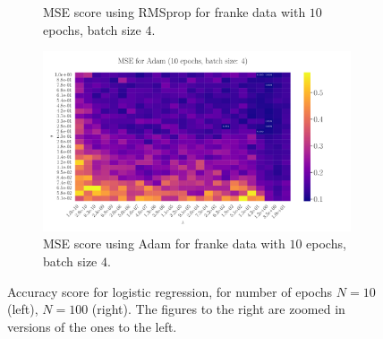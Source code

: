 \documentclass[%
reprint,s
amsmath,amssymb,
aps,
]{revtex4-2}
\begin{document}
\begin{figure}
\begin{subfigure}{0.41\textwidth}
		\caption{MSE score using RMSprop for franke data with \(10\) epochs, batch size \(4\).}
		\label{fig:LinReg25x25_epoch100_bacthS50}
	\end{subfigure}
	\hfill
	\begin{subfigure}{0.41\textwidth}
		\includegraphics[width=\textwidth]{Figures/LinRegAdam_25x25_epoch10_batchS4_zoomed.pdf}
		\caption{MSE score using Adam for franke data with \(10\) epochs, batch size \(4\).}
		\label{fig:LinReg25x25_epoch100_bacthS50_zoomed}
	\end{subfigure}
	\caption{Accuracy score for logistic regression, for number of epochs \(N=10\) (left), \(N=100\) (right). The figures to the right are zoomed in versions of the ones to the left.}
	\label{fig:LinReg}
\end{figure}

\end{document}
